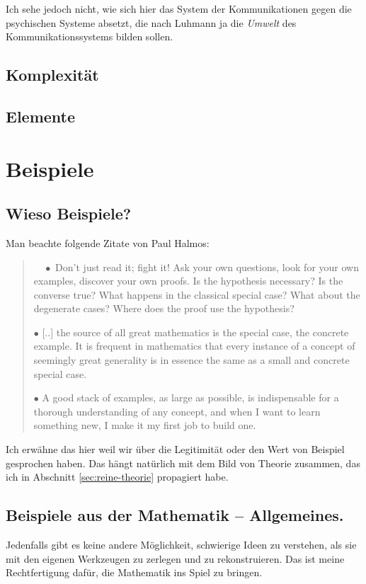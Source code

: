 \documentclass[a4paper, 10pt]{amsart}
\begin{document}
Ich sehe jedoch nicht, wie sich hier das System der Kommunikationen gegen die psychischen Systeme absetzt, die nach Luhmann ja die \emph{Umwelt} des Kommunikationssystems bilden sollen.
\subsection{Komplexit\"at}
\subsection{Elemente}
\section{Beispiele}
\subsection{Wieso Beispiele?} 
Man beachte folgende Zitate von Paul Halmos:
\begin{quotation}
$\quad \bullet$ Don't just read it; fight it! Ask your own questions, look for your own examples, discover your own proofs. Is the hypothesis necessary? Is the converse true? What happens in the classical special case? What about the degenerate cases? Where does the proof use the hypothesis?

$\bullet$ [..] the source of all great mathematics is the special case, the concrete example. It is frequent in mathematics that every instance of a concept of seemingly great generality is in essence the same as a small and concrete special case.

$\bullet$ A good stack of examples, as large as possible, is indispensable for a thorough understanding of any concept, and when I want to learn something new, I make it my first job to build one.
\end{quotation}
Ich erwähne das hier weil wir über die Legitimität oder den Wert von Beispiel gesprochen haben. Das hängt natürlich mit dem Bild von Theorie zusammen, das ich in Abschnitt \ref{sec:reine-theorie} propagiert habe.

\subsection{Beispiele aus der Mathematik -- Allgemeines.}
Jedenfalls gibt es keine andere Möglichkeit, schwierige Ideen zu verstehen, als sie mit den eigenen Werkzeugen zu zerlegen und zu rekonstruieren. Das ist meine Rechtfertigung dafür, die Mathematik ins Spiel zu bringen.
\end{document}
